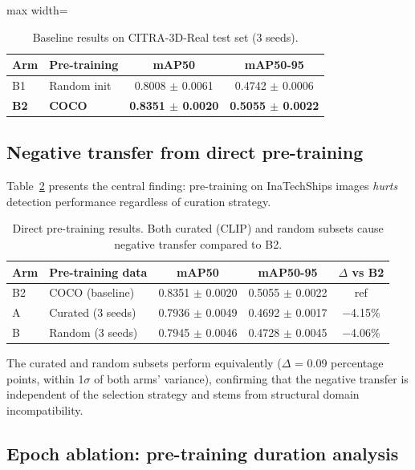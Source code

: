 \documentclass[a4paper,fleqn]{cas-dc}
\begin{document}
\begin{table}[!htbp]
\caption{Baseline results on CITRA-3D-Real test set (3 seeds).}\label{tab:baselines}
\begin{adjustbox}{max width=\columnwidth}
\begin{tabular}{@{}llcc@{}}
\toprule
Arm & Pre-training & mAP50 & mAP50-95 \\
\midrule
B1 & Random init & 0.8008 $\pm$ 0.0061 & 0.4742 $\pm$ 0.0006 \\
\textbf{B2} & \textbf{COCO} & \textbf{0.8351 $\pm$ 0.0020} & \textbf{0.5055 $\pm$ 0.0022} \\
\bottomrule
\end{tabular}
\end{adjustbox}
\end{table}

\subsection{Negative transfer from direct pre-training}\label{sec:negative_transfer}

Table~\ref{tab:negative_transfer} presents the central finding: pre-training on InaTechShips images \emph{hurts} detection performance regardless of curation strategy.

\begin{table}[!htbp]
\caption{Direct pre-training results. Both curated (CLIP) and random subsets cause negative transfer compared to B2.}\label{tab:negative_transfer}
\begin{tabular}{@{}llccc@{}}
\toprule
Arm & Pre-training data & mAP50 & mAP50-95 & $\Delta$ vs B2 \\
\midrule
B2 & COCO (baseline) & 0.8351 $\pm$ 0.0020 & 0.5055 $\pm$ 0.0022 & ref \\
A & Curated (3 seeds) & 0.7936 $\pm$ 0.0049 & 0.4692 $\pm$ 0.0017 & $-$4.15\% \\
B & Random (3 seeds) & 0.7945 $\pm$ 0.0046 & 0.4728 $\pm$ 0.0045 & $-$4.06\% \\
\bottomrule
\end{tabular}
\end{table}

The curated and random subsets perform equivalently ($\Delta$ = 0.09 percentage points, within 1$\sigma$ of both arms' variance), confirming that the negative transfer is independent of the selection strategy and stems from structural domain incompatibility.

\subsection{Epoch ablation: pre-training duration analysis}\label{sec:ablation}
\end{document}
